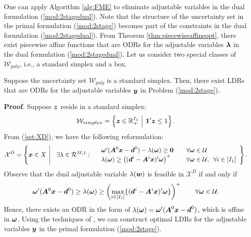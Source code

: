 \documentclass[fleqn,orsc,blindrev]{informs4}
\newcommand{\mb}[1]{\mbox{\boldmath \ensuremath{#1}}}
\begin{document}
	One can apply Algorithm \ref{alg:FME} to eliminate adjustable variables in the dual formulation (\ref{mod:2stagedual}). Note that the structure of the uncertainty set in the primal formulation (\ref{mod:2stage}) becomes part of the constraints in the dual formulation (\ref{mod:2stagedual}). From Theorem \ref{thm:piecewiseaffineopt}, there exist piecewise affine functions that are ODRs for the adjustable variables $\mb{\lambda}$ in the dual formulation (\ref{mod:2stagedual}). Let us consider two special classes of $\mathcal{W}_{poly}$, i.e., a standard simplex and a box.
	
	\begin{theorem} \label{thm:optsimplex}
		Suppose the uncertainty set $\mathcal{W}_{poly}$ is a standard simplex. Then, there exist LDRs that are ODRs for the adjustable variables $\mb{y}$ in Problem (\ref{mod:2stage}).
	\end{theorem}
	\textbf{Proof}. Suppose $\mb{z}$ reside in a standard simplex:
\begin{equation*}
	\mathcal{W}_{simplex} = \left\{ \mb{z}\in \mathbb{R}^{I_1}_+ \enskip \vline  \enskip \mb{1}'\mb{z} \le 1 \right\}. 
\end{equation*}
	From (\ref{set:XD}), we have the following reformulation:
\begin{equation*}
		\mathcal{X}^D=  \left\{ \mb{x} \in X \enskip \vline \enskip
		\enskip  \exists  \lambda \in \mathcal{R}^{M,1}: \begin{array}{lll}
			&  \mb{\omega}' (\mb{A}^0\mb{x}-\mb{d}^0) - \lambda(\mb{\omega}) \ge \mb{0}  & \quad \forall \mb{\omega} \in \mathcal{U} \\
			&\lambda(\mb{\omega}) \ge \left( (\mb{d}^i- \mb{A}^i\mb{x})'\mb{\omega}\right)^+   & \quad\forall \mb{\omega} \in \mathcal{U},  \enskip \forall i\in [I_1]
		\end{array}
		\right\}.
\end{equation*}
		Observe that the dual adjustable variable $\lambda(\mb{w})$ is feasible in $\mathcal{X}^D$ if and only if 
\begin{equation*}		\mb{\omega}' (\mb{A}^0\mb{x}-\mb{d}^0) \ge \lambda(\mb{\omega}) \geq \left(\max_{i \in[I_1]}\{(\mb{d}^i- \mb{A}^i\mb{x})'\mb{\omega}\}\right)^+ \qquad \forall \mb{\omega} \in \mathcal{U}.
\end{equation*}
		Hence, there exists an ODR in the form of $\lambda(\mb{\omega}) =  \mb{\omega}' (\mb{A}^0\mb{x}-\mb{d}^0)$, which is affine in $\mb{\omega}$. Using the techniques of \cite[Theorem 2]{bd16}, we can construct optimal LDRs for the adjustable variables $\mb{y}$ in the primal formulation (\ref{mod:2stage}).
	 \hfill \Halmos\\
	
\end{document}
